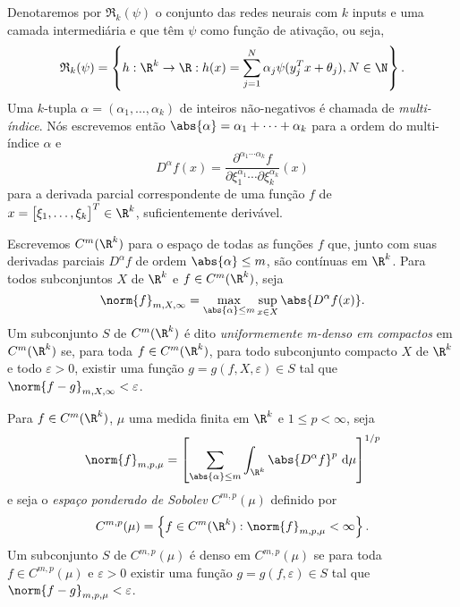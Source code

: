 Denotaremos por \( \mathfrak{R}_{ k }(\psi) \) o conjunto das redes neurais com \( k \) inputs e uma camada intermediária e que têm \( \psi \) como função de ativação, ou seja,
\begin{equation*}
    \mathfrak{R}_{ k }(\psi) =
    \left\{
        h : \R^{ k } \to \R :
        h(x) = \sum_{ j=1 }^{ N } \alpha_{ j } \psi (y_{ j }^{ T } x + \theta_{ j }),
        N \in \N
    \right\}
.\end{equation*}
Uma \( k \)-tupla \( \alpha = ( \alpha_{ 1 }, \dots, \alpha_{ k } ) \) de inteiros não-negativos é chamada de \emph{multi-índice}.
Nós escrevemos então \( \abs{ \alpha } = \alpha_{ 1 } + \cdots + \alpha_{ k } \) para a ordem do multi-índice \( \alpha \) e
\begin{equation*}
    D^{ \alpha } f(x) =
    \frac{ 
       \partial^{ \alpha_{ 1 } \cdots \alpha_{ k } } f
    }{ 
        \partial \xi_{ 1 }^{ \alpha_{ 1 } } \cdots \partial \xi_{ k }^{ \alpha_{ k } }
    } (x)
\end{equation*}
para a derivada parcial correspondente de uma função \( f \) de \( x = \begin{bmatrix}
    \xi_{ 1 }, \dots, \xi_{ k }
\end{bmatrix}^{ T } \in \R^{ k } \), suficientemente derivável.

Escrevemos \( C^{ m }(\R^{ k }) \) para o espaço de todas as funções \( f \) que, junto com suas derivadas parciais \( D^{ \alpha }f \) de ordem \( \abs{ \alpha } \leq m \), são contínuas em \( \R^{ k } \).
Para todos subconjuntos \( X \) de \( \R^{ k } \) e \( f \in C^{ m }(\R^{ k }) \), seja
\begin{equation*}
    \norm{ f }_{ m, X, \infty } =
    \max_{ \abs{ \alpha } \leq m }
    \sup_{ x \in X } \abs{ D^{ \alpha } f(x) }
.\end{equation*}
Um subconjunto \( S \) de \( C^{ m }(\R^{ k }) \) é dito \emph{uniformemente \emph{m}-denso em compactos} em \( C^{ m }(\R^{ k }) \) se, para toda \( f \in C^{ m }(\R^{ k }) \), para todo subconjunto compacto \( X \) de \( \R^{ k } \) e todo \( \varepsilon > 0 \), existir uma função \( g = g(f, X, \varepsilon) \in S \) tal que \( \norm{ f - g }_{ m, X, \infty } < \varepsilon \).

Para \( f \in C^{ m }(\R^{ k }) \), \( \mu \) uma medida finita em \( \R^{ k } \) e \( 1 \leq p < \infty \), seja
\begin{equation*}
    \norm{ f }_{ m, p, \mu } =
    \left[
        \sum_{ \abs{ \alpha } \leq m } \int_{ \R^{ k } } \abs{ D^{ \alpha } f }^{ p } \ \mathrm{d} \mu
    \right]^{ 1/p }
\end{equation*}
e seja o \emph{espaço ponderado de Sobolev} \( C^{ m, p }(\mu) \) definido por
\begin{equation*}
    C^{ m, p }(\mu) = \left\{ 
        f \in C^{ m }(\R^{ k }) : \norm{ f }_{ m, p, \mu } < \infty
    \right\}
.\end{equation*}
Um subconjunto \( S \) de \( C^{ m, p }(\mu) \) é denso em \( C^{ m, p }(\mu) \) se para toda \( f \in C^{ m, p }(\mu) \) e \( \varepsilon > 0 \) existir uma função \( g = g(f, \varepsilon) \in S \) tal que \( \norm{ f - g }_{ m, p, \mu } < \varepsilon \).

